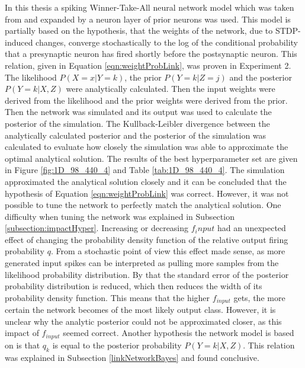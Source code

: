 In this thesis a spiking Winner-Take-All neural network model which was taken from \citet{nessler} and expanded by a neuron layer of prior neurons was used. This model is partially based on the hypothesis, that the weights of the network, due to STDP-induced changes, converge stochastically to the log of the conditional probability that a presynaptic neuron has fired shortly before the postsynaptic neuron. This relation, given in Equation \ref{eqn:weightProbLink}, was proven in Experiment 2. The likelihood $P(X=x|Y=k)$, the prior $P(Y=k|Z=j)$ and the posterior $P(Y = k|X, Z)$ were analytically calculated. Then the input weights were derived from the likelihood and the prior weights were derived from the prior. Then the network was simulated and its output was used to calculate the posterior of the simulation. The Kullback-Leibler divergence between the analytically calculated posterior and the posterior of the simulation was calculated to evaluate how closely the simulation was able to approximate the optimal analytical solution. The results of the best hyperparameter set are given in Figure \ref{fig:1D_98_440_4} and Table \ref{tab:1D_98_440_4}. The simulation approximated the analytical solution closely and it can be concluded that the hypothesis of Equation \ref{eqn:weightProbLink} was correct. However, it was not possible to tune the network to perfectly match the analytical solution. One difficulty when tuning the network was explained in Subsection \ref{subsection:impactHyper}. Increasing or decreasing $f_input$ had an unexpected effect of changing the probability density function of the relative output firing probability $q$. From a stochastic point of view this effect made sense, as more generated input spikes can be interpreted as pulling more samples from the likelihood probability distribution. By that the standard error of the posterior probability distribution is reduced, which then reduces the width of its probability density function. This means that the higher $f_{input}$ gets,  the more certain the network becomes of the most likely output class. However, it is unclear why the analytic posterior could not be approximated closer, as this impact of $f_{input}$ seemed correct.
Another hypothesis the network model is based on is that $q_k$ is equal to the posterior probability $P(Y = k|X, Z)$. This relation was explained in Subsection \ref{linkNetworkBayes} and found conclusive.

